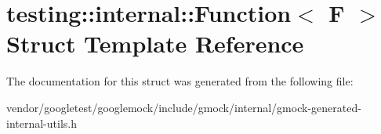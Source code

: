 \hypertarget{structtesting_1_1internal_1_1Function}{}\section{testing\+:\+:internal\+:\+:Function$<$ F $>$ Struct Template Reference}
\label{structtesting_1_1internal_1_1Function}


The documentation for this struct was generated from the following file\+:\begin{DoxyCompactItemize}
\item 
vendor/googletest/googlemock/include/gmock/internal/gmock-\/generated-\/internal-\/utils.\+h\end{DoxyCompactItemize}
